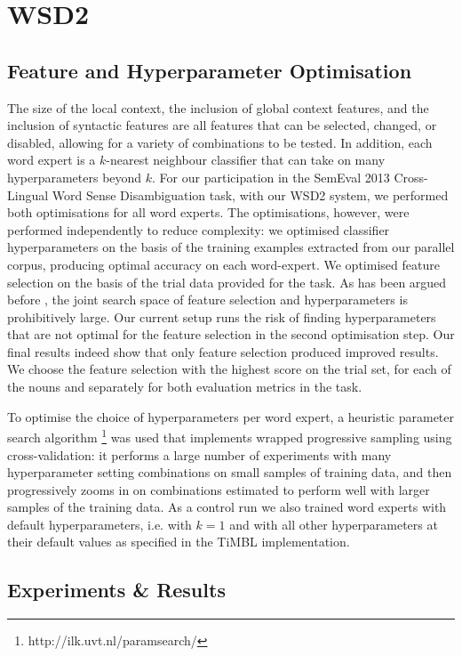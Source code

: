 \section{WSD2}

\subsection{Feature and Hyperparameter Optimisation}

The size of the local context, the inclusion of global context features, and
the inclusion of syntactic features are all features that can be selected,
changed, or disabled, allowing for a variety of combinations to be tested. In
addition, each word expert is a $k$-nearest neighbour classifier that can take
on many hyperparameters beyond $k$. For our participation in the SemEval 2013
Cross-Lingual Word Sense Disambiguation task, with our WSD2 system, we performed both
optimisations for all word experts. The optimisations, however, were performed
independently to reduce complexity: we optimised classifier hyperparameters on
the basis of the training examples extracted from our parallel corpus,
producing optimal accuracy on each word-expert. We optimised feature selection
on the basis of the trial data provided for the task. As has been argued before
\citep{Hoste+02}, the joint search space of feature selection and
hyperparameters is prohibitively large. Our current setup runs the risk of
finding hyperparameters that are not optimal for the feature selection in the
second optimisation step. Our final results indeed show that only feature
selection produced improved results. We choose the feature selection with the
highest score on the trial set, for each of the nouns and separately for both
evaluation metrics in the task.

To optimise the choice of hyperparameters per word expert, a heuristic
parameter search algorithm
\citep{PARAMSEARCH}\footnote{http://ilk.uvt.nl/paramsearch/} was used that
implements wrapped progressive sampling using cross-validation: it performs a
large number of experiments with many hyperparameter setting combinations on
small samples of training data, and then progressively zooms in on combinations
estimated to perform well with larger samples of the training data. As a
control run we also trained word experts with default hyperparameters, i.e.
with $k=1$ and with all other hyperparameters at their default values as
specified in the TiMBL implementation.

\subsection{Experiments \& Results}

